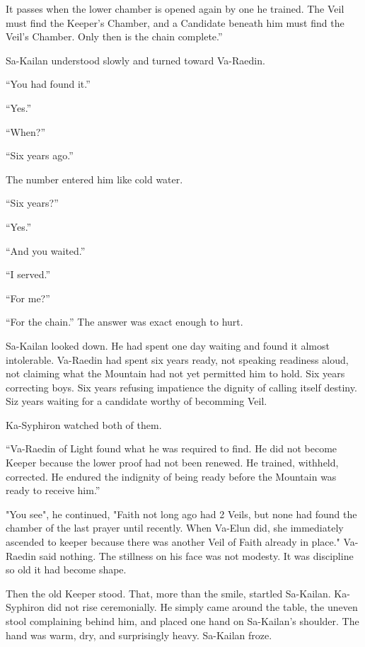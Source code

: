 It passes when the lower chamber is opened again by one he trained. The Veil must find the Keeper’s Chamber, and a Candidate beneath him must find the Veil’s Chamber. Only then is the chain complete.”\par
Sa-Kailan understood slowly and turned toward Va-Raedin.\par
“You had found it.”\par
“Yes.”\par
“When?”\par
“Six years ago.”\par
The number entered him like cold water.\par
“Six years?”\par
“Yes.”\par
“And you waited.”\par
“I served.”\par
“For me?”\par
“For the chain.” The answer was exact enough to hurt.\par

Sa-Kailan looked down. 
He had spent one day waiting and found it almost intolerable. 
Va-Raedin had spent six years ready, not speaking readiness aloud, not claiming what the Mountain had not yet permitted him to hold. 
Six years correcting boys. Six years refusing impatience the dignity of calling itself destiny.
Siz years waiting for a candidate worthy of becomming Veil.\par


Ka-Syphiron watched both of them.\par
“Va-Raedin of Light found what he was required to find. 
He did not become Keeper because the lower proof had not been renewed. He trained, withheld, corrected. 
He endured the indignity of being ready before the Mountain was ready to receive him.”\par
"You see", he continued, "Faith not long ago had 2 Veils, but none had found the chamber of the last prayer until recently. 
When Va-Elun did, she immediately ascended to keeper because there was another Veil of Faith already in place."
Va-Raedin said nothing. The stillness on his face was not modesty. It was discipline so old it had become shape. 


Then the old Keeper stood.
That, more than the smile, startled Sa-Kailan. Ka-Syphiron did not rise ceremonially. 
He simply came around the table, the uneven stool complaining behind him, and placed one hand on Sa-Kailan’s shoulder.
The hand was warm, dry, and surprisingly heavy. Sa-Kailan froze.\par


